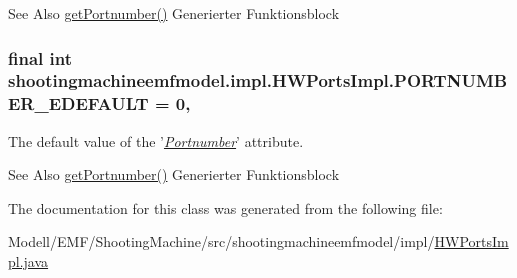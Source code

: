 \begin{DoxySeeAlso}{See Also}
\hyperlink{classshootingmachineemfmodel_1_1impl_1_1_h_w_ports_impl_a097170781924f6c67ddfb46893fc67bb}{get\-Portnumber()} Generierter Funktionsblock  
\end{DoxySeeAlso}
\hypertarget{classshootingmachineemfmodel_1_1impl_1_1_h_w_ports_impl_a9ea1507bc0aeed88c064a12f4315ee1b}{
\subsubsection[{P\-O\-R\-T\-N\-U\-M\-B\-E\-R\-\_\-\-E\-D\-E\-F\-A\-U\-L\-T}]{\setlength{\rightskip}{0pt plus 5cm}final int shootingmachineemfmodel.\-impl.\-H\-W\-Ports\-Impl.\-P\-O\-R\-T\-N\-U\-M\-B\-E\-R\-\_\-\-E\-D\-E\-F\-A\-U\-L\-T = 0\hspace{0.3cm}{\ttfamily [static]}, {\ttfamily [protected]}}}\label{classshootingmachineemfmodel_1_1impl_1_1_h_w_ports_impl_a9ea1507bc0aeed88c064a12f4315ee1b}
The default value of the '\hyperlink{classshootingmachineemfmodel_1_1impl_1_1_h_w_ports_impl_a097170781924f6c67ddfb46893fc67bb}{{\itshape Portnumber}}' attribute.

\begin{DoxySeeAlso}{See Also}
\hyperlink{classshootingmachineemfmodel_1_1impl_1_1_h_w_ports_impl_a097170781924f6c67ddfb46893fc67bb}{get\-Portnumber()} Generierter Funktionsblock  
\end{DoxySeeAlso}


The documentation for this class was generated from the following file\-:\begin{DoxyCompactItemize}
\item 
Modell/\-E\-M\-F/\-Shooting\-Machine/src/shootingmachineemfmodel/impl/\hyperlink{_h_w_ports_impl_8java}{H\-W\-Ports\-Impl.\-java}\end{DoxyCompactItemize}
